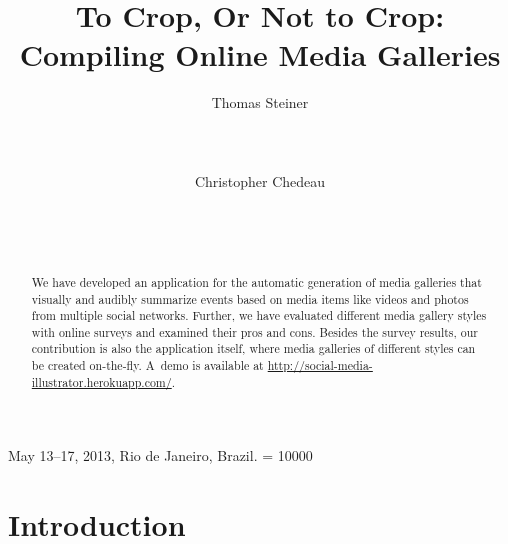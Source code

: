 \documentclass{sig-alt-release2}
\newcommand{\inlinelistingsize}{\fontsize{8pt}{11pt}}
\let\oldurl\url
\renewcommand{\url}[1]{\inlinelistingsize\oldurl{#1}}
\begin{document}
 {May 13--17, 2013, Rio de Janeiro, Brazil.} 
\widowpenalty = 10000

\title{To Crop, Or Not to Crop: Compiling Online Media Galleries}

\author{
\alignauthor
Thomas Steiner\\
	\\
	\\
	\\
\alignauthor
Christopher Chedeau\\
	\\
	\\
	\\
}
\maketitle

\begin{abstract}
We have developed an application for the automatic generation of
media galleries that visually and audibly summarize events
based on media items like videos and photos from multiple social networks.
Further, we have evaluated different media gallery styles with online surveys 
and examined their pros and cons.
Besides the survey results, our contribution is also the application itself,
where media galleries of different styles can be created on-the-fly.
A~demo is available at
\url{http://social-media-illustrator.herokuapp.com/}.
\end{abstract}

\vspace{-1mm}

\vspace{-2mm}

\vspace{-2mm}

\section{Introduction}
\label{sec:introduction}
\end{document}
